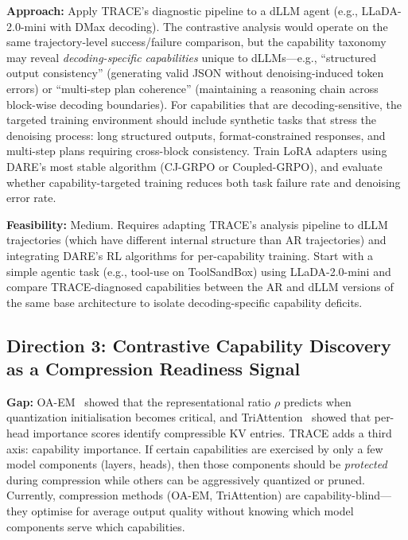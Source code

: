 \documentclass[11pt]{article}
\begin{document}
\textbf{Approach:} Apply TRACE's diagnostic pipeline to a dLLM agent (e.g., LLaDA-2.0-mini with DMax decoding). The contrastive analysis would operate on the same trajectory-level success/failure comparison, but the capability taxonomy may reveal \textit{decoding-specific capabilities} unique to dLLMs---e.g., ``structured output consistency'' (generating valid JSON without denoising-induced token errors) or ``multi-step plan coherence'' (maintaining a reasoning chain across block-wise decoding boundaries). For capabilities that are decoding-sensitive, the targeted training environment should include synthetic tasks that stress the denoising process: long structured outputs, format-constrained responses, and multi-step plans requiring cross-block consistency. Train LoRA adapters using DARE's most stable algorithm (CJ-GRPO or Coupled-GRPO), and evaluate whether capability-targeted training reduces both task failure rate and denoising error rate.

\textbf{Feasibility:} Medium. Requires adapting TRACE's analysis pipeline to dLLM trajectories (which have different internal structure than AR trajectories) and integrating DARE's RL algorithms for per-capability training. Start with a simple agentic task (e.g., tool-use on ToolSandBox) using LLaDA-2.0-mini and compare TRACE-diagnosed capabilities between the AR and dLLM versions of the same base architecture to isolate decoding-specific capability deficits.

\subsection{Direction 3: Contrastive Capability Discovery as a Compression Readiness Signal}

\textbf{Gap:} OA-EM~\cite{oaem} showed that the representational ratio $\rho$ predicts when quantization initialisation becomes critical, and TriAttention~\cite{triattention} showed that per-head importance scores identify compressible KV entries. TRACE adds a third axis: capability importance. If certain capabilities are exercised by only a few model components (layers, heads), then those components should be \textit{protected} during compression while others can be aggressively quantized or pruned. Currently, compression methods (OA-EM, TriAttention) are capability-blind---they optimise for average output quality without knowing which model components serve which capabilities.
\end{document}
